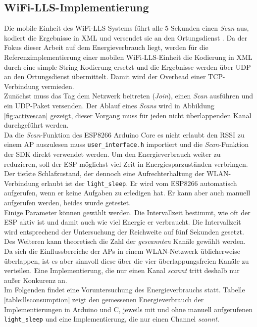 \subsection{WiFi-LLS-Implementierung}
\label{ch:phase1:sec:wifills}
Die mobile Einheit des WiFi-LLS Systems führt alle 5 Sekunden einen \emph{Scan} aus, kodiert die Ergebnisse in XML und versendet sie an den Ortungsdienst \cite{chen2007design}.
Da der Fokus dieser Arbeit auf dem Energieverbrauch liegt, werden für die Referenzimplementierung einer mobilen WiFi-LLS-Einheit die Kodierung in XML durch eine simple String Kodierung ersetzt und die Ergebnisse werden über UDP an den Ortungsdienst übermittelt. 
Damit wird der Overhead einer TCP-Verbindung vermieden.\\
Zunächst muss das Tag dem Netzwerk beitreten (\emph{Join}), einen \emph{Scan} ausführen und ein UDP-Paket versenden.
Der Ablauf eines \emph{Scans} wird in Abbildung \ref{fig:activescan} gezeigt, dieser Vorgang muss für jeden nicht überlappenden Kanal durchgeführt werden.\\
Da die \emph{Scan}-Funktion des ESP8266 Arduino Core es nicht erlaubt den RSSI zu einem AP auszulesen muss \texttt{user\_interface.h} importiert und die \emph{Scan}-Funktion der SDK direkt verwendet werden.
Um den Energieverbrauch weiter zu reduzieren, soll der ESP möglichst viel Zeit in Energiesparzuständen verbringen.
Der tiefste Schlafzustand, der dennoch eine Aufrechterhaltung der WLAN-Verbindung erlaubt ist der \texttt{light\_sleep}. 
Er wird vom ESP8266 automatisch aufgerufen, wenn er keine Aufgaben zu erledigen hat.
Er kann aber auch manuell aufgerufen werden, beides wurde getestet.\\
Einige Parameter können gewählt werden. 
Die Intervallzeit bestimmt, wie oft der ESP aktiv ist und damit auch wie viel Energie er verbraucht.
Die Intervallzeit wird entsprechend der Untersuchung der Reichweite auf fünf Sekunden gesetzt.
Des Weiteren kann theoretisch die Zahl der \emph{gescannten} Kanäle gewählt werden. 
Da sich die Einflussbereiche der APs in einem WLAN-Netzwerk üblicherweise überlappen, ist es aber sinnvoll diese über die vier überlappungsfreien Kanäle zu verteilen. 
Eine Implementierung, die nur einen Kanal \emph{scannt} tritt deshalb nur außer Konkurenz an.\\
Im Folgenden findet eine Voruntersuchung des Energieverbrauchs statt.
Tabelle \ref{table:llsconsumption} zeigt den gemessenen Energieverbrauch der Implementierungen in Arduino und C, jeweils mit und ohne manuell aufgerufenen \texttt{light\_sleep} und eine Implementierung, die nur einen Channel \emph{scannt}.

